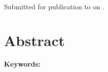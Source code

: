 \documentclass[onecolumn,12pt,A4]{article}
\begin{document}
\begin{FlushLeft}
    {\Large\bfseries \Title}
    \\[0.3cm]
    \Authors
    \\[0.3cm]
    {\Affiliations}
    \\[0.3cm]
    {Submitted for publication to \textit{\Journal{}} on \SubmittedOn.}
\end{FlushLeft}

\linenumbers

\section*{Abstract}



\vspace{0.5cm}
\noindent
\textbf{Keywords:} \Keywords{}





\end{document}
